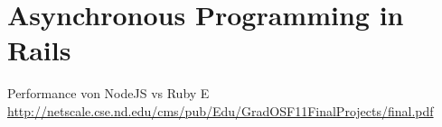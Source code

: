 \section{Asynchronous Programming in Rails}
\label{section: Asynchronous Programming in Rails}


Performance von NodeJS vs Ruby E
\url{http://netscale.cse.nd.edu/cms/pub/Edu/GradOSF11FinalProjects/final.pdf}